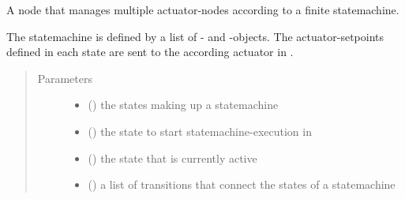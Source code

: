 \documentclass[a4paper,12pt,twoside]{article}
\begin{document}

\begin{fulllineitems}
\label{\detokenize{osbk_operation:osbk_operation.actuator_state_machine.ActuatorStateMachine}}
A node that manages multiple actuator-nodes according to a finite statemachine.

The statemachine is defined by a list of - and -objects. The 
actuator-setpoints defined in each state are sent to the according actuator in .
\begin{quote}\begin{description}
\item[{Parameters}] \leavevmode\begin{itemize}
\item {} 
 (\sphinxstyleliteralemphasis{\sphinxupquote{{[}}}{\hyperref[\detokenize{osbk_operation:osbk_operation.utility.State}]{\sphinxcrossref{\sphinxstyleliteralemphasis{\sphinxupquote{State}}}}}\sphinxstyleliteralemphasis{\sphinxupquote{{]}}}) \textendash{} the states making up a statemachine

\item {} 
 ({\hyperref[\detokenize{osbk_operation:osbk_operation.utility.State}]{}}) \textendash{} the state to start statemachine-execution in

\item {} 
 ({\hyperref[\detokenize{osbk_operation:osbk_operation.utility.State}]{}}) \textendash{} the state that is currently active

\item {} 
 (\sphinxstyleliteralemphasis{\sphinxupquote{{[}}}{\hyperref[\detokenize{osbk_operation:osbk_operation.utility.Transition}]{\sphinxcrossref{\sphinxstyleliteralemphasis{\sphinxupquote{Transition}}}}}\sphinxstyleliteralemphasis{\sphinxupquote{{]}}}) \textendash{} a list of transitions that connect the states of a statemachine


\end{itemize}
\end{description}
\end{quote}
\end{fulllineitems}
\end{document}

